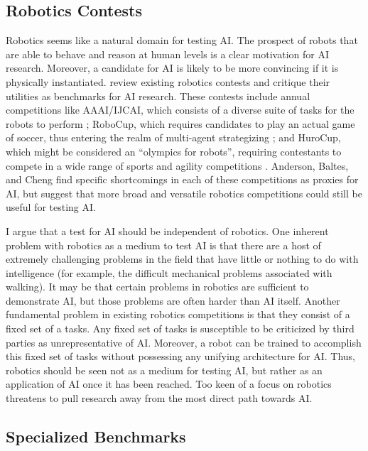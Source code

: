 \subsection{Robotics Contests}

Robotics seems like a natural domain for testing AI. The prospect of robots that are able to behave and reason at human levels is a clear motivation for AI research. Moreover, a candidate for AI is likely to be more convincing if it is physically instantiated. \citet{anderson2011robotics} review existing robotics contests and critique their utilities as benchmarks for AI research. These contests include annual competitions like AAAI/IJCAI, which consists of a diverse suite of tasks for the robots to perform \citep{balch2002ten}; RoboCup, which requires candidates to play an actual game of soccer, thus entering the realm of multi-agent strategizing \citep{kitano1997robocup}; and HuroCup, which might be considered an ``olympics for robots'', requiring contestants to compete in a wide range of sports and agility competitions \citep{baltes2009hurocup}. Anderson, Baltes, and Cheng find specific shortcomings in each of these competitions as proxies for AI, but suggest that more broad and versatile robotics competitions could still be useful for testing AI.

I argue that a test for AI should be independent of robotics. One inherent problem with robotics as a medium to test AI is that there are a host of extremely challenging problems in the field that have little or nothing to do with intelligence (for example, the difficult mechanical problems associated with walking). It may be that certain problems in robotics are sufficient to demonstrate AI, but those problems are often harder than AI itself. Another fundamental problem in existing robotics competitions is that they consist of a fixed set of a tasks. Any fixed set of tasks is susceptible to be criticized by third parties as unrepresentative of AI. Moreover, a robot can be trained to accomplish this fixed set of tasks without possessing any unifying architecture for AI. Thus, robotics should be seen not as a medium for testing AI, but rather as an application of AI once it has been reached. Too keen of a focus on robotics threatens to pull research away from the most direct path towards AI. 

\subsection{Specialized Benchmarks}

